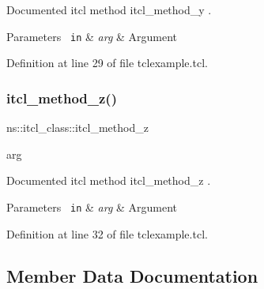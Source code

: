 Documented itcl method {\ttfamily itcl\+\_\+method\+\_\+y} . 


\begin{DoxyParams}[1]{Parameters}
\mbox{\texttt{ in}}  & {\em arg} & Argument \\
\hline
\end{DoxyParams}


Definition at line 29 of file tclexample.\+tcl.


\begin{DoxyCode}{0}

\end{DoxyCode}
\mbox{\label{classns_1_1itcl__class_a13a383c766e489814960345540106cc1}} 
\subsubsection{\texorpdfstring{itcl\_method\_z()}{itcl\_method\_z()}}
{\footnotesize\ttfamily ns\+::itcl\+\_\+class\+::itcl\+\_\+method\+\_\+z\begin{DoxyParamCaption}\item[{}]{arg  }\end{DoxyParamCaption}}



Documented itcl method {\ttfamily itcl\+\_\+method\+\_\+z} . 


\begin{DoxyParams}[1]{Parameters}
\mbox{\texttt{ in}}  & {\em arg} & Argument \\
\hline
\end{DoxyParams}


Definition at line 32 of file tclexample.\+tcl.


\begin{DoxyCode}{0}

\end{DoxyCode}


\subsection{Member Data Documentation}
\mbox{\label{classns_1_1itcl__class_a8df46696ce554fed04d170932260fbb8}} 

